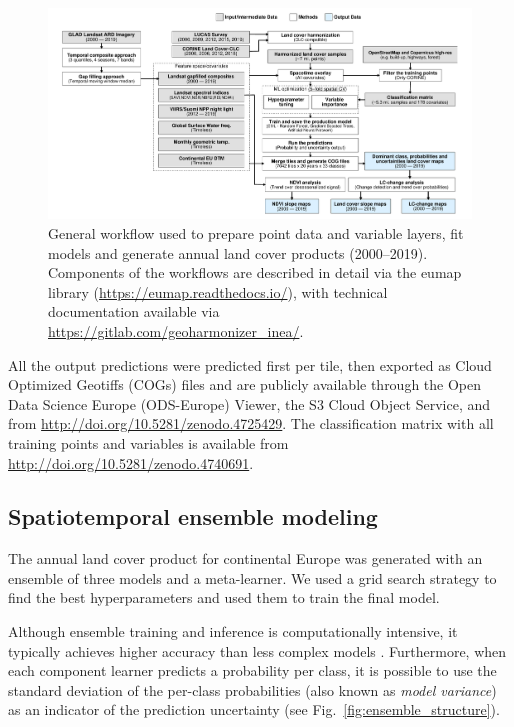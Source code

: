     \begin{figure}
    \centering
    \includegraphics[width=.95\textwidth]{figs_03/methods_general_workflow.pdf}
    \caption{General workflow used to prepare point data and variable layers, fit models and generate annual land cover products (2000--2019). Components of the workflows are described in detail via the \textsf{eumap} library (\url{https://eumap.readthedocs.io/}), with technical documentation available via \url{https://gitlab.com/geoharmonizer_inea/}.} \label{fig:scheme}
    \end{figure}
    
    All the output predictions were predicted first per tile, then exported as Cloud Optimized Geotiffs (COGs) files and are publicly available through the Open Data Science Europe (ODS-Europe) Viewer, the S3 Cloud Object Service, and from \url{http://doi.org/10.5281/zenodo.4725429}. The classification matrix with all training points and variables is available from \url{http://doi.org/10.5281/zenodo.4740691}.
    
\subsection*{Spatiotemporal ensemble modeling}
    
    The annual land cover product for continental Europe was generated with an ensemble of three models and a meta-learner. We used a grid search strategy to find the best hyperparameters and used them to train the final model.
    
        
    Although ensemble training and inference is computationally intensive, it typically achieves higher accuracy than less complex models \citep{seni2010ensemble,zhang2012ensemble}. Furthermore, when each component learner predicts a probability per class, it is possible to use the standard deviation of the per-class probabilities (also known as \emph{model variance}) as an indicator of the prediction uncertainty (see Fig.\@~\ref{fig:ensemble_structure}).

